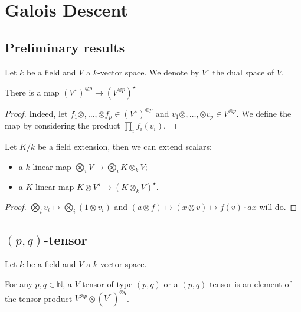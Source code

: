 \chapter{Galois Descent}

\section{Preliminary results}
Let $k$ be a field and $V$ a $k$-vector space. We denote by $V^{\star}$ the dual space of $V$.

\begin{lemma}\label{lem:dual-tensor-power}
  There is a map $(V^{\star})^{\otimes p} \to (V^{\otimes p})^\star$
  \leanok
\end{lemma}
\begin{proof}
Indeed, let $f_1 \otimes, \dots, \otimes f_p \in (V^{\star})^{\otimes p}$ and $v_1 \otimes, \dots, \otimes v_p \in V^{\otimes p}$. We define the map by considering the product $\prod_{i} f_i (v_i)$.
\end{proof}

\begin{lemma}\label{lem:extend-scalars}
  \leanok%
  Let $K/k$ be a field extension, then we can extend scalars:
  \begin{itemize}
    \item a $k$-linear map $\bigotimes_{i} V \to \bigotimes_{i} K \otimes_{k} V$;
    \item a $K$-linear map $K \otimes V^{\star} \to \left(K \otimes_{k} V\right)^{\star}$.
  \end{itemize}
\end{lemma}

\begin{proof}
  $\bigotimes_{i} v_{i} \mapsto \bigotimes_{i} (1\otimes v_{i})$ and $(a \otimes f) \mapsto (x \otimes v) \mapsto f(v)\cdot ax$ will do.
\end{proof}

\section{$(p, q)$-tensor}\label{sec:p-q-tensor}

Let $k$ be a field and $V$ a $k$-vector space.

\begin{definition}\label{def:tensor-of-type}%
  For any $p, q \in \mathbb{N}$, a $V$-tensor of type $(p,q)$ or a $(p, q)$-tensor is an element of the tensor product $V^{\otimes p} \otimes {(V^*)}^{\otimes q}$.
  \leanok%
\end{definition}



